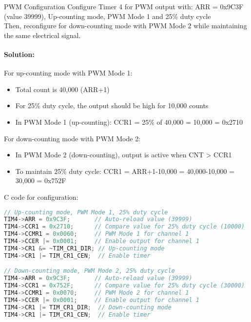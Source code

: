 \begin{example2}{PWM Configuration}
Configure Timer 4 for PWM output with: ARR = 0x9C3F (value 39999), Up-counting mode, PWM Mode 1 and 25\% duty cycle
\vspace{1mm}\\
Then, reconfigure for down-counting mode with PWM Mode 2 while maintaining the same electrical signal.
\paragraph{Solution:}
For up-counting mode with PWM Mode 1:
\begin{itemize}
    \item Total count is 40,000 (ARR+1)
    \item For 25\% duty cycle, the output should be high for 10,000 counts
    \item In PWM Mode 1 (up-counting): CCR1 = 25\% of 40,000 = 10,000 = 0x2710
\end{itemize}

For down-counting mode with PWM Mode 2:
\begin{itemize}
    \item In PWM Mode 2 (down-counting), output is active when CNT > CCR1
    \item To maintain 25\% duty cycle: CCR1 = ARR+1-10,000 = 40,000-10,000 = 30,000 = 0x752F
\end{itemize}

C code for configuration:
\begin{lstlisting}[language=C, style=basesmol]
// Up-counting mode, PWM Mode 1, 25% duty cycle
TIM4->ARR = 0x9C3F;       // Auto-reload value (39999)
TIM4->CCR1 = 0x2710;      // Compare value for 25% duty cycle (10000)
TIM4->CCMR1 = 0x0060;     // PWM Mode 1 for channel 1
TIM4->CCER |= 0x0001;     // Enable output for channel 1
TIM4->CR1 &= ~TIM_CR1_DIR; // Up-counting mode
TIM4->CR1 |= TIM_CR1_CEN;  // Enable timer

// Down-counting mode, PWM Mode 2, 25% duty cycle
TIM4->ARR = 0x9C3F;       // Auto-reload value (39999)
TIM4->CCR1 = 0x752F;      // Compare value for 25% duty cycle (30000)
TIM4->CCMR1 = 0x0070;     // PWM Mode 2 for channel 1
TIM4->CCER |= 0x0001;     // Enable output for channel 1
TIM4->CR1 |= TIM_CR1_DIR;  // Down-counting mode
TIM4->CR1 |= TIM_CR1_CEN;  // Enable timer
\end{lstlisting}
\end{example2}

